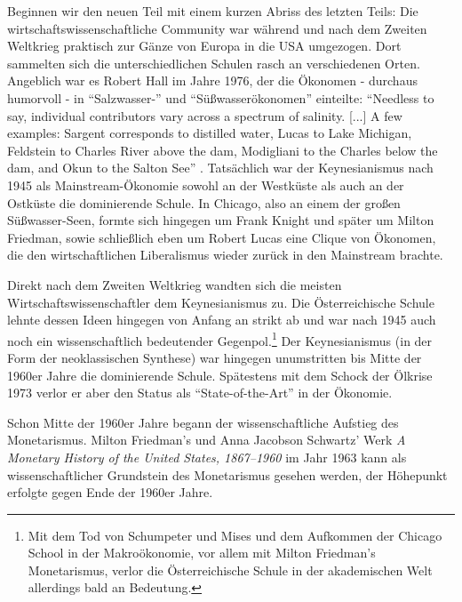 Beginnen wir den neuen Teil mit einem kurzen Abriss des letzten Teils: Die wirtschaftswissenschaftliche Community war während und nach dem Zweiten Weltkrieg praktisch zur Gänze von Europa in die USA umgezogen. Dort sammelten sich die unterschiedlichen Schulen rasch an verschiedenen Orten. Angeblich war es Robert Hall im Jahre 1976, der die Ökonomen - durchaus humorvoll - in "`Salzwasser-"' und "`Süßwasserökonomen"' einteilte: "`Needless to say, individual contributors vary across a spectrum of salinity. [...] A few examples: Sargent corresponds to distilled water, Lucas to Lake Michigan, Feldstein to Charles River above the dam, Modigliani to the Charles below the dam, and Okun to the Salton See"' \parencite[S. 1]{Hall1976}. Tatsächlich war der Keynesianismus nach 1945 als Mainstream-Ökonomie sowohl an der Westküste als auch an der Ostküste die dominierende Schule. In Chicago, also an einem der großen Süßwasser-Seen, formte sich hingegen um Frank Knight und später um Milton Friedman, sowie schließlich eben um Robert Lucas eine Clique von Ökonomen, die den wirtschaftlichen Liberalismus wieder zurück in den Mainstream brachte.

Direkt nach dem Zweiten Weltkrieg wandten sich die meisten Wirtschaftswissenschaftler dem Keynesianismus zu. Die Österreichische Schule lehnte dessen Ideen hingegen von Anfang an strikt ab und war nach 1945 auch noch ein wissenschaftlich bedeutender Gegenpol.\footnote{Mit dem Tod von Schumpeter und Mises und dem Aufkommen der Chicago School in der Makroökonomie, vor allem mit Milton Friedman's Monetarismus, verlor die Österreichische Schule in der akademischen Welt allerdings bald an Bedeutung.} Der Keynesianismus (in der Form der neoklassischen Synthese) war hingegen unumstritten bis Mitte der 1960er Jahre die dominierende Schule. Spätestens mit dem Schock der Ölkrise 1973 verlor er aber den Status als "`State-of-the-Art"' in der Ökonomie. 

Schon Mitte der 1960er Jahre begann der wissenschaftliche Aufstieg des Monetarismus. Milton Friedman's und Anna Jacobson Schwartz' Werk \textit{A Monetary History of the United States, 1867–1960} im Jahr 1963 kann als wissenschaftlicher Grundstein des Monetarismus gesehen werden, der Höhepunkt erfolgte gegen Ende der 1960er Jahre. 

